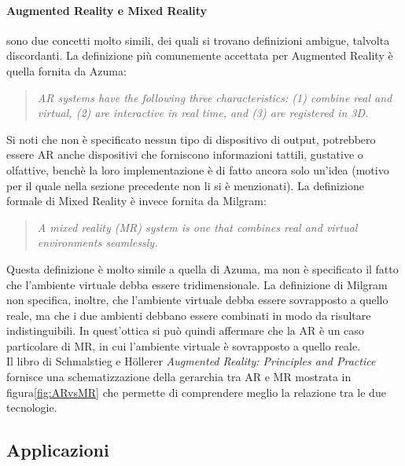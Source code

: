         \paragraph{Augmented Reality e Mixed Reality} sono due concetti molto simili, dei quali si trovano
            definizioni ambigue, talvolta discordanti. La definizione più comunemente accettata per Augmented 
            Reality è quella fornita da Azuma\cite{Azuma1997}:
            \begin{quote}
                \textit{AR systems have the following three characteristics: (1) combine real and virtual, 
                (2) are interactive in real time, and (3) are registered in 3D.}
            \end{quote}
            Si noti che non è specificato nessun tipo di dispositivo di output, potrebbero essere 
            AR anche dispositivi che forniscono informazioni tattili, gustative o olfattive, benchè
            la loro implementazione è di fatto ancora solo un'idea (motivo per il quale nella sezione
            precedente non li si è menzionati). La definizione formale di Mixed Reality è invece 
            fornita da Milgram\cite{Milgram1994}:
            \begin{quote}
                \textit{A mixed reality (MR) system is one that combines real and virtual environments 
                seamlessly.}
            \end{quote}
            Questa definizione è molto simile a quella di Azuma, ma non è specificato il fatto che
            l'ambiente virtuale debba essere tridimensionale. La definizione di Milgram
            non specifica, inoltre, che l'ambiente virtuale debba essere sovrapposto a quello reale, ma che
            i due ambienti debbano essere combinati in modo da risultare indistinguibili. In quest'ottica 
            si può quindi affermare che la AR è un caso particolare di MR, in cui l'ambiente virtuale è
            sovrapposto a quello reale. \\
            Il libro di Schmalstieg e Höllerer \textit{Augmented Reality: Principles and Practice}\cite{Schmalstieg2016} 
            fornisce una schematizzazione della gerarchia tra AR e MR mostrata in figura\ref{fig:ARvsMR}
            che permette di comprendere meglio la relazione tra le due tecnologie. 
            
    \subsection{Applicazioni}\label{subsec:XRTipologie}
        

